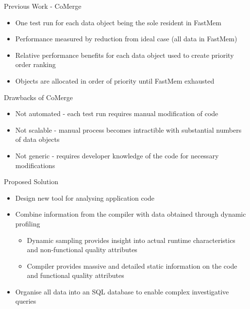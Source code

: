 \documentclass[final]{beamer}
\let\olditem\item
\renewcommand{\item}{\vspace{\fill}\olditem}
\begin{document}
\begin{frame}{\hspace{0.02\paperwidth}Previous Work - CoMerge}
\begin{itemize}
\item One test run for each data object being the sole resident in FastMem
\item Performance measured by reduction from ideal case (all data in FastMem)
\item Relative performance benefits for each data object used to create priority order ranking
\item Objects are allocated in order of priority until FastMem exhausted
\end{itemize}
\end{frame}

\begin{frame}{\hspace{0.02\paperwidth}Drawbacks of CoMerge}
\begin{itemize}
\item Not automated - each test run requires manual modification of code
\item Not scalable - manual process becomes intractible with substantial numbers of data objects
\item Not generic - requires developer knowledge of the code for necessary modifications
\end{itemize}
\end{frame}

\begin{frame}{\hspace{0.02\paperwidth}Proposed Solution}
\begin{itemize}
\item Design new tool for analysing application code
\item Combine information from the compiler with data obtained through dynamic profiling
\begin{itemize}
\item Dynamic sampling provides insight into actual runtime characteristics and non-functional quality attributes
\item Compiler provides massive and detailed static information on the code and functional quality attributes
\end{itemize}
\item Organise all data into an \acs{SQL} database to enable complex investigative queries
\end{itemize}
\end{frame}
\end{document}
